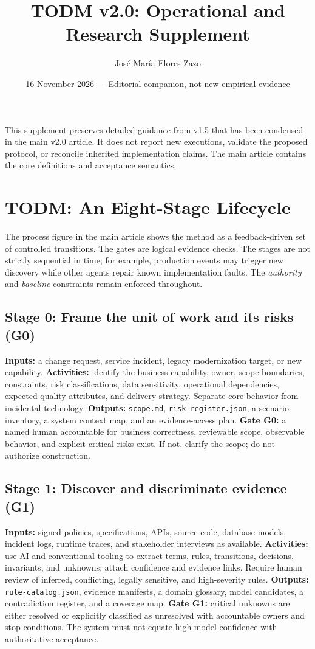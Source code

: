 \documentclass[11pt,a4paper]{article}
\title{TODM v2.0: Operational and Research Supplement}
\author{Jos\'e Mar\'ia Flores Zazo}
\date{16 November 2026 --- Editorial companion, not new empirical evidence}
\begin{document}
\maketitle
This supplement preserves detailed guidance from v1.5 that has been condensed in the main v2.0 article. It does not report new executions, validate the proposed protocol, or reconcile inherited implementation claims. The main article contains the core definitions and acceptance semantics.
\section{TODM: An Eight-Stage Lifecycle}
The process figure in the main article shows the method as a feedback-driven set of controlled transitions. The gates are logical evidence checks. The stages are not strictly sequential in time; for example, production events may trigger new discovery while other agents repair known implementation faults. The \emph{authority} and \emph{baseline} constraints remain enforced throughout.



\subsection{Stage 0: Frame the unit of work and its risks (G0)}
\textbf{Inputs:} a change request, service incident, legacy modernization target, or new capability. \textbf{Activities:} identify the business capability, owner, scope boundaries, constraints, risk classifications, data sensitivity, operational dependencies, expected quality attributes, and delivery strategy. Separate core behavior from incidental technology. \textbf{Outputs:} \texttt{scope.md}, \texttt{risk-register.json}, a scenario inventory, a system context map, and an evidence-access plan. \textbf{Gate G0:} a named human accountable for business correctness, reviewable scope, observable behavior, and explicit critical risks exist. If not, clarify the scope; do not authorize construction.

\subsection{Stage 1: Discover and discriminate evidence (G1)}
\textbf{Inputs:} signed policies, specifications, APIs, source code, database models, incident logs, runtime traces, and stakeholder interviews as available. \textbf{Activities:} use AI and conventional tooling to extract terms, rules, transitions, decisions, invariants, and unknowns; attach confidence and evidence links. Require human review of inferred, conflicting, legally sensitive, and high-severity rules. \textbf{Outputs:} \texttt{rule-catalog.json}, evidence manifests, a domain glossary, model candidates, a contradiction register, and a coverage map. \textbf{Gate G1:} critical unknowns are either resolved or explicitly classified as unresolved with accountable owners and stop conditions. The system must not equate high model confidence with authoritative acceptance.
\end{document}
